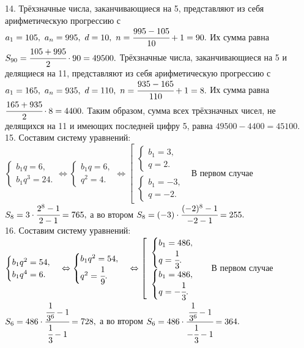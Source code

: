 14. Трёхзначные числа, заканчивающиеся на 5, представляют из себя арифметическую прогрессию с $a_1=105,\ a_n=995,\ d=10,\ n=\cfrac{995-105}{10}+1=90.$ Их сумма равна $S_{90}=\cfrac{105+995}{2}\cdot90=49500.$ Трёхзначные числа, заканчивающиеся на 5 и делящиеся на 11, представляют из себя арифметическую прогрессию с $a_1=165,\ a_n=935,\ d=110,\ n=\cfrac{935-165}{110}+1=8.$ Их сумма равна $\cfrac{165+935}{2}\cdot8=4400.$ Таким образом, сумма всех трёхзначных чисел, не делящихся на 11 и имеющих последней цифру 5, равна $49500-4400=45100.$\\
15. Составим систему уравнений: $\begin{cases}b_1q=6,\\b_1q^3=24.\end{cases}\Leftrightarrow\begin{cases}b_1q=6,\\q^2=4.\end{cases}
\Leftrightarrow\left[\begin{array}{l}\begin{cases}b_1=3,\\q=2.\end{cases}\\ \begin{cases}b_1=-3,\\q=-2.\end{cases}\end{array}\right.$ В первом случае
$S_8=3\cdot\cfrac{2^8-1}{2-1}=765,$ а во втором $S_8=(-3)\cdot\cfrac{(-2)^8-1}{-2-1}=255.$\\
16. Составим систему уравнений: $\begin{cases}b_1q^2=54,\\b_1q^4=6.\end{cases}\Leftrightarrow\begin{cases}b_1q^2=54,\\q^2=\cfrac{1}{9}.\end{cases}
\Leftrightarrow\left[\begin{array}{l}\begin{cases}b_1=486,\\q=\cfrac{1}{3}.\end{cases}\\ \begin{cases}b_1=486,\\q=-\cfrac{1}{3}.\end{cases}\end{array}\right.$ В первом случае
$S_6=486\cdot\cfrac{\cfrac{1}{3^6}-1}{\cfrac{1}{3}-1}=728,$ а во втором $S_6=486\cdot\cfrac{\cfrac{1}{3^6}-1}{-\cfrac{1}{3}-1}=364.$\\
